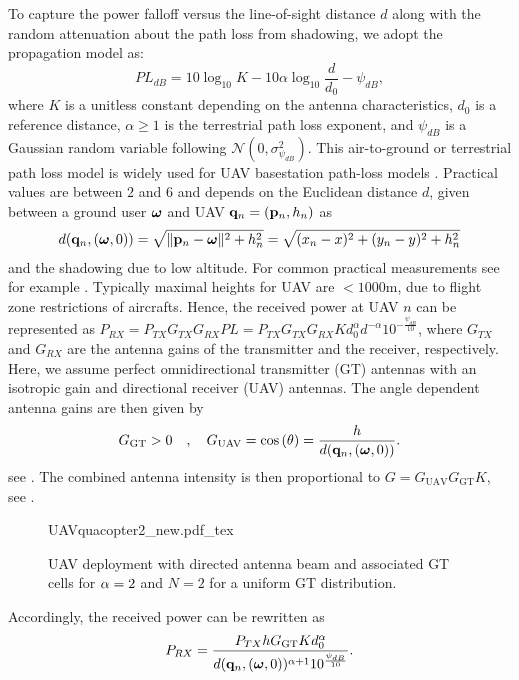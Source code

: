 \documentclass[smallabstract,smallcaptions]{dccpaper}
\newcounter{example}[section]
\newcommand{\GGT}{\ensuremath{G_{\text{GT}}}}         %
\newcommand{\GUAV}{\ensuremath{G_{\text{UAV}}}}         %
\begin{document}
To capture the power falloff versus the line-of-sight distance $d$
along with the random attenuation about the path loss from shadowing, we adopt the propagation model \cite[(2.51)]{AG}
as:
%
\begin{equation}
  PL_{dB}=10\log_{10}{K}-10\alpha\log_{10}{\frac{d}{d_0}}-\psi_{dB},
\end{equation}
%
where $K$ is a unitless constant depending on the antenna characteristics, $d_0$ is a reference distance, $\alpha\geq 1$
is the terrestrial path loss exponent, and $\psi_{dB}$ is a Gaussian random variable following
$\mathcal{N}\left(0,\sigma^2_{\psi_{dB}}\right)$. This air-to-ground or terrestrial path loss model is widely used for
UAV basestation path-loss models \cite{MSBD16a}. Practical values are between $2$ and $6$ and depends on the Euclidean
distance $d$, given between a ground user $\boldsymbol{ \omega}$ and UAV ${\mathbf q}_n=({\mathbf p}_n,h_n)$ as
%
\begin{align}
  d({\mathbf q}_n,(\boldsymbol{ \omega},0))=\sqrt{\|{\mathbf p}_n-\boldsymbol{ \omega}\|^2+h_n^2}=\sqrt{(x_n-x)^2+(y_n-y)^2+h_n^2}\label{eq:eucd}
\end{align}
%
and the shadowing due to low altitude.  For common practical measurements see for example \cite{AG18}.  Typically
maximal heights for UAV are $<1000$m, due to flight zone restrictions of aircrafts.  Hence, the received power at
UAV $n$ can be represented as
%
$P_{RX}=P_{TX}G_{TX}G_{RX}PL=P_{TX}G_{TX}G_{RX}Kd^{\alpha}_0 d^{-\alpha}10^{-\frac{\psi_{dB}}{10}}$,
%
where $G_{TX}$ and $G_{RX}$ are the antenna gains of the transmitter and the receiver, respectively. Here, we assume
perfect omnidirectional transmitter (GT) antennas with an isotropic gain and directional receiver (UAV) antennas.  The
angle dependent antenna gains are then given by 
%
\begin{equation}
\GGT >0\quad,\quad
  \GUAV = \cos\left(\theta\right)=\frac{h}{d(\vq_n,(\vome,0))}.
\label{eq:Gdirected}
\end{equation}
%
see \cite[pp.52]{Bal05a}. The combined antenna intensity is then proportional to
%
$G=\GUAV \GGT K$, see .
%
\begin{figure}
  \centering
  \def\svgwidth{.9\textwidth} \scriptsize{
    {UAVquacopter2_new.pdf_tex}}
    \caption{UAV deployment with directed antenna beam and associated GT cells for $\alpha=2$ and $N=2$ for a uniform GT distribution.}
    \label{fig:uavdirected}
\end{figure}
%
Accordingly, the received power can be rewritten as
%
\begin{equation}
  P_{RX}=\frac{P_{TX}h \GGT K d^{\alpha}_0}{d(\vq_n,(\vome,0))^{\alpha+1}10^{\frac{\psi_{dB}}{10}}}.
\end{equation}
\end{document}
